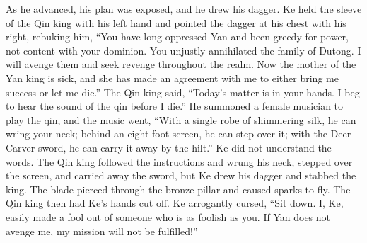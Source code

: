 \documentclass[12pt]{book}
\begin{document}
\begin{pairs}
\begin{Leftside}
\begin{fioesjfsoeifj}
As he advanced, his plan was exposed, and he drew his dagger. Ke held the sleeve of the Qin king with his left hand and pointed the dagger at his chest with his right, rebuking him, ``You have long oppressed Yan and been greedy for power, not content with your dominion. You unjustly annihilated the family of Dutong. I will avenge them and seek revenge throughout the realm. Now the mother of the Yan king is sick, and she has made an agreement with me to either bring me success or let me die.'' The Qin king said, ``Today's matter is in your hands. I beg to hear the sound of the qin before I die.'' He summoned a female musician to play the qin, and the music went, ``With a single robe of shimmering silk, he can wring your neck; behind an eight-foot screen, he can step over it; with the Deer Carver sword, he can carry it away by the hilt.'' Ke did not understand the words. The Qin king followed the instructions and wrung his neck, stepped over the screen, and carried away the sword, but Ke drew his dagger and stabbed the king. The blade pierced through the bronze pillar and caused sparks to fly. The Qin king then had Ke's hands cut off. Ke arrogantly cursed, ``Sit down. I, Ke, easily made a fool out of someone who is as foolish as you. If Yan does not avenge me, my mission will not be fulfilled!''
\pend
\endnumbering
\end{fioesjfsoeifj}
\end{Leftside}
\end{pairs}
\Columns
\end{document}

